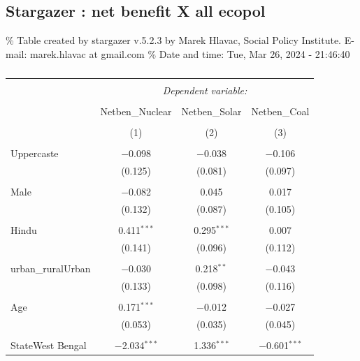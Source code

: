 \documentclass[
]{article}
\begin{document}
\newpage

\hypertarget{stargazer-net-benefit-x-all-ecopol}{%
\subsection{Stargazer : net benefit X all
ecopol}\label{stargazer-net-benefit-x-all-ecopol}}

\begingroup\setlength{\tabcolsep}{1pt}

\renewcommand{\arraystretch}{0.7}

\% Table created by stargazer v.5.2.3 by Marek Hlavac, Social Policy
Institute. E-mail: marek.hlavac at gmail.com \% Date and time: Tue, Mar
26, 2024 - 21:46:40

\begin{table}[!htbp] \centering 
  \caption{} 
  \label{} 
\begin{tabular}{@{\extracolsep{5pt}}lccc} 
\\[-1.8ex]\hline 
\hline \\[-1.8ex] 
 & \multicolumn{3}{c}{\textit{Dependent variable:}} \\ 
\cline{2-4} 
\\[-1.8ex] & Netben\_Nuclear & Netben\_Solar & Netben\_Coal \\ 
\\[-1.8ex] & (1) & (2) & (3)\\ 
\hline \\[-1.8ex] 
 Uppercaste & $-$0.098 & $-$0.038 & $-$0.106 \\ 
  & (0.125) & (0.081) & (0.097) \\ 
  & & & \\ 
 Male & $-$0.082 & 0.045 & 0.017 \\ 
  & (0.132) & (0.087) & (0.105) \\ 
  & & & \\ 
 Hindu & 0.411$^{***}$ & 0.295$^{***}$ & 0.007 \\ 
  & (0.141) & (0.096) & (0.112) \\ 
  & & & \\ 
 urban\_ruralUrban & $-$0.030 & 0.218$^{**}$ & $-$0.043 \\ 
  & (0.133) & (0.098) & (0.116) \\ 
  & & & \\ 
 Age & 0.171$^{***}$ & $-$0.012 & $-$0.027 \\ 
  & (0.053) & (0.035) & (0.045) \\ 
  & & & \\ 
 StateWest Bengal & $-$2.034$^{***}$ & 1.336$^{***}$ & $-$0.601$^{***}$ \\ 

\end{tabular}
\end{table}
\end{document}
